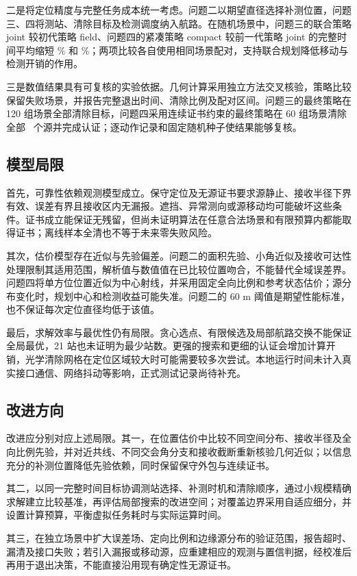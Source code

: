 {\heiti 二是将定位精度与完整任务成本统一考虑。}\songti 问题二以期望直径选择补测位置，问题三、四将测站、清除目标及检测调度纳入航路。在随机场景中，问题三的联合策略 \textrm{joint} 较初代策略 \textrm{field}、问题四的紧凑策略 \textrm{compact} 较前一代策略 \textrm{joint} 的完整时间平均缩短 \QThreeSaving\% 和 \QFourSaving\%；两项比较各自使用相同场景配对，支持联合规划降低移动与检测开销的作用。

{\heiti 三是数值结果具有可复核的实验依据。}\songti 几何计算采用独立方法交叉核验，策略比较保留失败场景，并报告完整退出时间、清除比例及配对区间。问题三的最终策略在 120 组场景全部清除目标，问题四采用连续证书约束的最终策略在 60 组场景清除全部 \QFourSourceTotal\ 个源并完成认证；逐动作记录和固定随机种子使结果能够复核。

\subsection{模型局限}
{\heiti 首先，可靠性依赖观测模型成立。}\songti 保守定位及无源证书要求源静止、接收半径下界有效、误差有界且接收区内无漏报。遮挡、异常测向或源移动均可能破坏这些条件。证书成立能保证无残留，但尚未证明算法在任意合法场景和有限预算内都能取得证书；离线样本全清也不等于未来零失败风险。

{\heiti 其次，估价模型存在近似与先验偏差。}\songti 问题二的面积先验、小角近似及接收可达性处理限制其适用范围，解析值与数值值在已比较位置吻合，不能替代全域误差界。问题四将单方位位置近似为中心射线，并采用固定全向比例和参考状态估价；源分布变化时，规划中心和检测收益可能失准。问题二的 60 m 阈值是期望性能标准，也不保证每次定位直径均低于该值。

{\heiti 最后，求解效率与最优性仍有局限。}\songti 贪心选点、有限候选及局部航路交换不能保证全局最优，21 站也未证明为最少站数。更强的搜索和更细的认证会增加计算开销，光学清除网格在定位区域较大时可能需要较多次尝试。本地运行时间未计入真实接口通信、网络抖动等影响，正式测试记录尚待补充。

\subsection{改进方向}
改进应分别对应上述局限。其一，在位置估价中比较不同空间分布、接收半径及全向比例先验，并对近共线、不同交会角分支和接收截断重新核验几何近似；以信息充分的补测位置降低先验依赖，同时保留保守外包与连续证书。

其二，以同一完整时间目标协调测站选择、补测时机和清除顺序，通过小规模精确求解建立比较基准，再评估局部搜索的改进空间；对覆盖边界采用自适应细分，并设置计算预算，平衡虚拟任务耗时与实际运算时间。

其三，在独立场景中扩大误差场、定向比例和边缘源分布的验证范围，报告超时、漏清及接口失败；若引入漏报或移动源，应重建相应的观测与置信判据，经校准后再用于退出决策，不能直接沿用现有确定性无源证书。\label{sec:evaluation-end}
